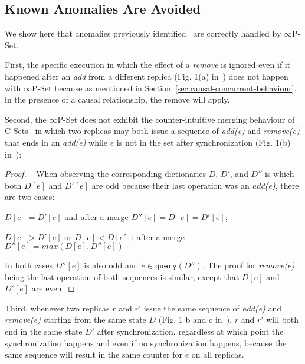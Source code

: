 \documentclass[9pt, oneside]{article}   	%
\begin{document}
\subsection{Known Anomalies Are Avoided}

We show here that anomalies previously identified~\cite{bieniusa:hal-00769554} are correctly handled by $\infty$P-Set. 

First, the specific execution in which the effect of a \textit{remove} is ignored even if it happened after an \textit{add} from a different replica (Fig. 1(a) in~\cite{bieniusa:hal-00769554}) does not happen with $\infty$P-Set because as mentioned in Section~\ref{sec:causal-concurrent-behaviour}, in the presence of a causal relationship, the remove will apply.

Second,  the $\infty$P-Set does not exhibit the counter-intuitive merging behaviour of C-Sets~\cite{bieniusa:hal-00769554} in which two replicas may both issue a sequence of \textit{add(e)} and \textit{remove(e)} that ends in an \textit{add(e)} while $e$ is not in the set after synchronization (Fig. 1(b) in~\cite{bieniusa:hal-00769554}):

\begin{proof}


	\pf~ When observing the corresponding dictionaries $D$, $D'$, and $D''$ is which both $D[e]$ and $D'[e]$ are odd because their last operation was an \textit{add(e)}, there are two cases:
	\begin{pfenum}
    		\item $D[e]=D'[e]$ and after a merge $D''[e]=D[e]=D'[e]$;
    		\item $D[e]>D'[e]$ or $D[e]<D[e']$: after a merge $D''[e]=max(D[e], D''[e])$
	\end{pfenum}   

	In both cases $D''[e]$ is also odd and $e \in  \texttt{query}(D'')$.  The proof for \textit{remove(e)} being the last operation of both sequences is similar, except that $D[e]$ and $D'[e]$ are even.

\end{proof}

Third, whenever two replicas $r$ and $r'$ issue the same sequence of \textit{add(e)} and \textit{remove(e)} starting from the same state $D$ (Fig. 1 b and c in~\cite{bieniusa:hal-00769554}), $r$ and $r'$ will both end in the same state $D'$ after synchronization, regardless at which point the synchronization happens and even if no synchronization happens, because the same sequence will result in the same counter for $e$ on all replicas.
\end{document}
